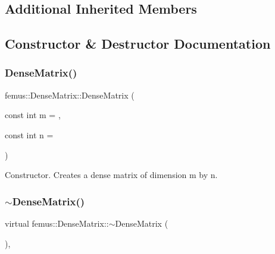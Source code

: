\subsection*{Additional Inherited Members}


\subsection{Constructor \& Destructor Documentation}
\mbox{\label{classfemus_1_1_dense_matrix_a5f0562386636a86cea485eca2df4780d}} 
\subsubsection{\texorpdfstring{Dense\+Matrix()}{DenseMatrix()}}
{\footnotesize\ttfamily femus\+::\+Dense\+Matrix\+::\+Dense\+Matrix (\begin{DoxyParamCaption}\item[{const int}]{m = {},  }\item[{const int}]{n = {} }\end{DoxyParamCaption})\hspace{0.3cm}{\ttfamily [inline]}}



Constructor. Creates a dense matrix of dimension {\ttfamily m} by {\ttfamily n}. 

\mbox{\label{classfemus_1_1_dense_matrix_a641288aa079e581caa61a8ca9ebfc8f9}} 
\subsubsection{\texorpdfstring{$\sim$\+Dense\+Matrix()}{~DenseMatrix()}}
{\footnotesize\ttfamily virtual femus\+::\+Dense\+Matrix\+::$\sim$\+Dense\+Matrix (\begin{DoxyParamCaption}{ }\end{DoxyParamCaption})\hspace{0.3cm}{\ttfamily [inline]}, {\ttfamily [virtual]}}



